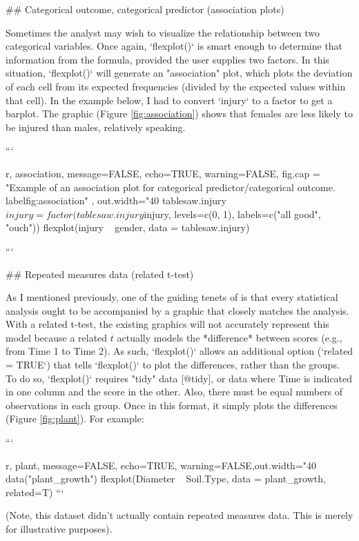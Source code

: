 {{{{{## Categorical outcome, categorical predictor (association plots)

Sometimes the analyst may wish to visualize the relationship between two categorical variables. Once again, `flexplot()` is smart enough to determine that information from the formula, provided the user supplies two factors. In this situation, `flexplot()` will generate an "association" plot, which plots the deviation of each cell from its expected frequencies (divided by the expected values within that cell). In the example below, I had to convert `injury` to a factor to get a barplot. The graphic (Figure \ref{fig:association}) shows that females are less likely to be injured than males, relatively speaking. 

```{r, association, message=FALSE, echo=TRUE, warning=FALSE, fig.cap = "Example of an association plot for categorical predictor/categorical outcome.\\label{fig:association}" , out.width="40%
tablesaw.injury$injury = factor(tablesaw.injury$injury, 
                  levels=c(0, 1), labels=c("all good", "ouch"))
flexplot(injury ~ gender, data = tablesaw.injury)

```


## Repeated measures data (related t-test)

As I mentioned previously, one of the guiding tenets of  is that every statistical analysis ought to be accompanied by a graphic that closely matches the analysis. With a related t-test, the existing graphics will not accurately represent this model because a related $t$ actually models the *difference* between scores (e.g., from Time 1 to Time 2). As such, `flexplot()` allows an additional option (`related = TRUE`) that tells `flexplot()` to plot the differences, rather than the groups. To do so, `flexplot()` requires "tidy" data [@tidy], or data where Time is indicated in one column and the score in the other. Also, there must be equal numbers of observations in each group. Once in this format, it simply plots the differences (Figure \ref{fig:plant}). For example:

```{r, plant, message=FALSE, echo=TRUE, warning=FALSE,out.width="40%
data("plant_growth")
flexplot(Diameter ~ Soil.Type, data = plant_growth, related=T)
```

\noindent (Note, this dataset didn't actually contain repeated measures data. This is merely for illustrative purposes). 

}}}}}}}

